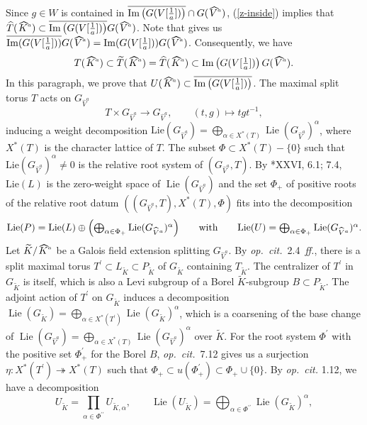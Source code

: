 \documentclass[a4paper,11pt,reqno]{amsart}
\newcommand{\ra}{\rightarrow}
\newcommand{\wt}{\widetilde}
\newcommand{\wh}{\widehat}
\newcommand{\pr}{^{\prime}}
\newcommand{\prpr}{^{\prime\prime}}
\newcommand{\ov}{\overline}
\newcommand{\surjects}{\twoheadrightarrow}
\newcommand{\hva}{\!\stackon[-8pt]{\;$V^{\raisebox{1pt}{$\mathsmaller{\mathsmaller{a}}$}}$}{\vstretch{1.5}{\hstretch{1.7}{\widehat{\phantom{}}}}}}
\newcommand{\hka}{\!\stackon[-8pt]{\;$K^{\raisebox{1pt}{$\mathsmaller{\mathsmaller{a}}$}}$}{\vstretch{1.5}{\hstretch{1.7}{\widehat{\phantom{}}}}}}
\newcommand{\via}{V{[\f{1}{a}]}}
\newcommand{\nhva}{\wh{V}^a}
\providecommand{\p}[1]{\left(#1\right)}
\providecommand{\f}[2]{\frac{#1}{#2}}
\DeclareMathOperator{\Lie}{Lie}		                                                  %
\newcommand{\qq}{\quad\quad}
\newcommand{\tst}{\textstyle}
\theoremstyle{plain}
\theoremstyle{remark}
\theoremstyle{definition}
\theoremstyle{plain}
\theoremstyle{definition}
\theoremstyle{subsection-tweak}
\theoremstyle{subsection-tweak}
\numberwithin{equation}{subsection}
\begin{document}
        Since $g\in W$ is contained in $\ov{\mathrm{Im}\p{G(\via)}}\cap G(\hva)$, (\ref{z-inside}) implies that $\wh{T}(\hka)\subset \ov{\mathrm{Im}\p{G(\via)}}G(\hva)$.
        Note that  gives us $\ov{\mathrm{Im}(G(\via))}G(\hva)=\mathrm{Im}(G(\via))G(\hva)$. 
        Consequently, we have
        \begin{equation}\label{tor-decomp}
         \tst T(\hka)\subset \wt{T}(\hka)=\wh{T}(\hka)\subset \mathrm{Im}\p{G(\via)}G(\hva).
        \end{equation}
      In this paragraph, we prove that $U(\hka)\subset \ov{\mathrm{Im}\p{G(\via)}}$.
      The maximal split torus $T$ acts on $G_{\nhva}$
\[
   T\times G_{\nhva}\ra G_{\nhva},\qq (t, g)\mapsto tgt^{-1},
\]
inducing a weight decomposition $\mathrm{Lie}(G_{\nhva})=\bigoplus_{\alpha\in X^{\ast}(T)}\Lie(G_{\nhva})^{\alpha}$, where $X^{\ast}(T)$ is the character lattice of $T$. 
The subset $\Phi \subset X^{\ast}(T)-\{0\}$ such that $\mathrm{Lie}(G_{\nhva})^{\alpha}\neq 0$ is the relative root system of $(G_{\nhva}, T)$. 
By \cite{SGA3IIInew}*{XXVI, 6.1;  7.4}, $\mathrm{Lie}(L)$ is the zero-weight space of $\Lie(G_{\nhva})$ and the set $\Phi_{+}$ of positive roots of the relative root datum $((G_{\nhva}, T), X^{\ast}(T), \Phi)$ fits into the decomposition  
\[
   \tst \text{$\mathrm{Lie}(P)=\mathrm{Lie}(L)\oplus \p{\bigoplus_{\alpha\in \Phi_+}\mathrm{Lie}(G_{\nhva})^{\alpha}}$\qq  with\qq  $\Lie(U)=\bigoplus_{\alpha\in \Phi_+}\Lie(G_{\nhva})^{\alpha}$.}      
\]
Let $\wt{K}/\hka$ be a Galois field extension splitting $G_{\nhva}$.
By \emph{op.~cit.}~2.4~\emph{ff.}, there is a split maximal torus $T\pr\subset L_{\wt{K}}\subset P_{\wt{K}}$ of $G_{\wt{K}}$ containing $T_{\wt{K}}$. 
The centralizer of $T\pr$ in $G_{\wt{K}}$ is itself, which is also a Levi subgroup of a Borel $\wt{K}$-subgroup $B\subset P_{\wt{K}}$.
The adjoint action of $T\pr$ on $G_{\wt{K}}$ induces a decomposition $\Lie(G_{\wt{K}})=\bigoplus_{\alpha\in X^{\ast}(T\pr)}\Lie(G_{\wt{K}})^{\alpha}$, which is a coarsening of the base change of $\Lie(G_{\nhva})=\bigoplus_{\alpha\in X^{\ast}(T)}\Lie(G_{\nhva})^{\alpha}$ over $\wt{K}$. 
For the root system $\Phi\pr$ with the positive set $\Phi\pr_{+}$ for the Borel $B$, \emph{op.~cit.}~7.12 gives us a surjection $\eta \colon X^{\ast}(T\pr) \surjects X^{\ast}(T)$ such that $\Phi_{+}\subset u(\Phi\pr_+)\subset \Phi_{+}\cup \{0\}$.
By \emph{op.~cit.} 1.12, we have a decomposition
\[
\tst  U_{\wt{K}}=\prod_{\alpha\in \Phi\prpr}U_{\wt{K},\alpha},\qq \Lie(U_{\wt{K}})=\bigoplus_{\alpha\in \Phi\prpr}\Lie(G_{\wt{K}})^{\alpha},
   \] 
\end{document}
